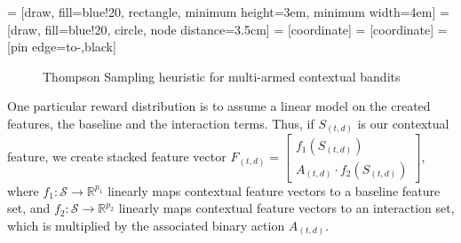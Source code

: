  = [draw, fill=blue!20, rectangle, 
    minimum height=3em, minimum width=4em]
 = [draw, fill=blue!20, circle, node distance=3.5cm]
 = [coordinate]
 = [coordinate]
 = [pin edge={to-,black}]

\begin{figure}[h!]
\centering
{}

\caption{Thompson Sampling heuristic for multi-armed contextual bandits}
\label{Thompson Sampling for Contextual Bandits}
\end{figure}

One particular reward distribution is to assume a linear model on the created features, the baseline and the interaction terms.  Thus, if $S_{(t,d)}$ is our contextual feature, we create stacked feature vector $F_{(t,d)} = \begin{bmatrix} f_1(S_{(t,d)}) \\
A_{(t,d)} \cdot f_2(S_{(t,d)})
\end{bmatrix}$, where $f_1: \mathcal{S} \to \mathbb{R}^{p_1}$ linearly maps contextual feature vectors to a baseline feature set, and $f_2: \mathcal{S} \to \mathbb{R}^{p_2}$ linearly maps contextual feature vectors to an interaction set, which is multiplied by the associated binary action $A_{(t,d)}$.

